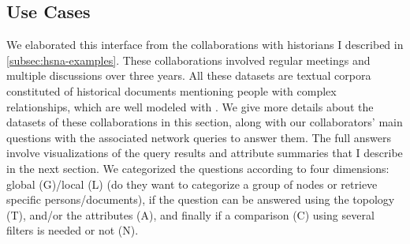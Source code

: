 \subsection{Use Cases}

We elaborated this interface from the collaborations with historians I described in \autoref{subsec:hsna-examples}.
These collaborations involved regular meetings and multiple discussions over three years.
All these datasets are textual corpora constituted of historical documents mentioning people with complex relationships, which are well modeled with \modelplural.
We give more details about the datasets of these collaborations in this section, along with our collaborators' main questions with the associated network queries to answer them.
The full answers involve visualizations of the query results and attribute summaries that I describe in the next section.
We categorized the questions according to four dimensions: global (G)/local (L) (do they want to categorize a group of nodes or retrieve specific persons/documents), if the question can be answered using the topology (T), and/or the attributes (A), and finally if a comparison (C) using several filters is needed or not (N).

